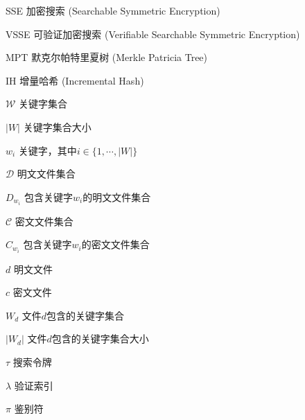 \begin{denotation}[3cm]
\item[SSE] 加密搜索 (Searchable Symmetric Encryption)
\item[VSSE] 可验证加密搜索 (Verifiable Searchable Symmetric Encryption)
\item[MPT] 默克尔帕特里夏树 (Merkle Patricia Tree)
\item[IH] 增量哈希 (Incremental Hash)
\item[$\mathcal{W}$] 关键字集合
\item[$|W|$] 关键字集合大小
\item[$w_i$ ] 关键字，其中$i \in \{1, \cdots, |W|\}$
\item[$\mathcal{D}$] 明文文件集合
\item[$D_{w_i}$] 包含关键字$w_i$的明文文件集合
\item[$\mathcal{C}$] 密文文件集合
\item[$C_{w_i}$] 包含关键字$w_i$的密文文件集合
\item[$d$] 明文文件
\item[$c$] 密文文件
\item[$W_d$] 文件$d$包含的关键字集合
\item[$|W_d|$] 文件$d$包含的关键字集合大小
\item[$\tau$]	搜索令牌
\item[$\lambda$] 验证索引
\item[$\pi$] 鉴别符
\end{denotation}
